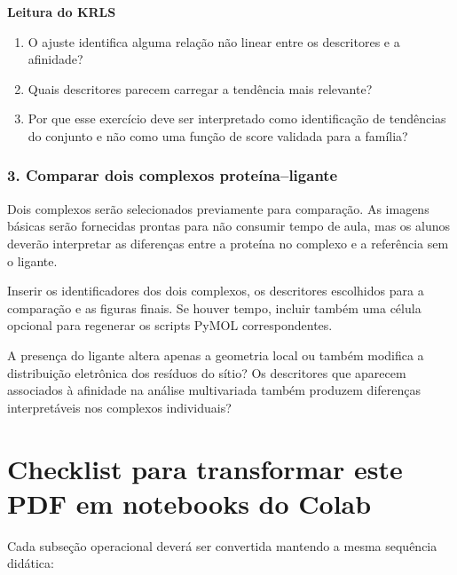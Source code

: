 \documentclass[a4paper,11pt]{refart}
\begin{document}
\begin{interpretacaobox}
\textbf{Leitura do KRLS}
\begin{enumerate}
    \item O ajuste identifica alguma relação não linear entre os descritores e a afinidade?
    \item Quais descritores parecem carregar a tendência mais relevante?
    \item Por que esse exercício deve ser interpretado como identificação de tendências do conjunto e não como uma função de score validada para a família?
\end{enumerate}
\end{interpretacaobox}

\subsubsection{3. Comparar dois complexos proteína--ligante}

Dois complexos serão selecionados previamente para comparação. As imagens básicas serão fornecidas prontas para não consumir tempo de aula, mas os alunos deverão interpretar as diferenças entre a proteína no complexo e a referência sem o ligante.

\begin{todobox}
Inserir os identificadores dos dois complexos, os descritores escolhidos para a comparação e as figuras finais. Se houver tempo, incluir também uma célula opcional para regenerar os scripts PyMOL correspondentes.
\end{todobox}

\begin{interpretacaobox}
A presença do ligante altera apenas a geometria local ou também modifica a distribuição eletrônica dos resíduos do sítio? Os descritores que aparecem associados à afinidade na análise multivariada também produzem diferenças interpretáveis nos complexos individuais?
\end{interpretacaobox}

\section{Checklist para transformar este PDF em notebooks do Colab}

Cada subseção operacional deverá ser convertida mantendo a mesma sequência didática:
\end{document}
